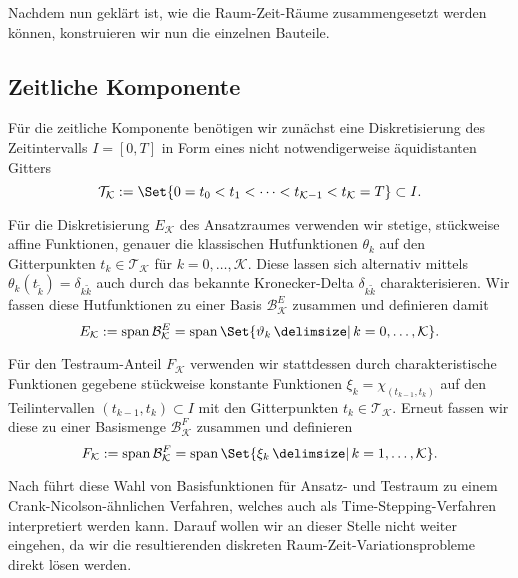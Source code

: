 \documentclass[../main.tex]{subfiles}
\begin{document}
Nachdem nun geklärt ist, wie die Raum-Zeit-Räume zusammengesetzt werden können, konstruieren wir nun die einzelnen Bauteile.

\subsection*{Zeitliche Komponente}

Für die zeitliche Komponente benötigen wir zunächst eine Diskretisierung des Zeitintervalls $I = [0, T]$ in Form eines nicht notwendigerweise äquidistanten Gitters
\begin{equation}
\label{eq:zeitgitter}
    \mathcal T_{\mathcal K} := \Set{0 = t_0 < t_1 < \dots < t_{\mathcal K - 1} < t_{\mathcal K} = T} \subset I.
\end{equation}

Für die Diskretisierung $E_{\mathcal K}$ des Ansatzraumes verwenden wir stetige, stückweise affine Funktionen, genauer die klassischen Hutfunktionen $\theta_{k}$ auf den Gitterpunkten $t_{k} \in \mathcal T_{\mathcal K}$ für $k = 0, \dots, \mathcal K$.
Diese lassen sich alternativ mittels $\theta_{k}(t_{\tilde{k}}) = \delta_{k \tilde k}$ auch durch das bekannte Kronecker-Delta $\delta_{k \tilde k}$ charakterisieren.
Wir fassen diese Hutfunktionen zu einer Basis $\mathcal B^{E}_{\mathcal K}$ zusammen und definieren damit
\begin{equation}
    \label{eq:zeitanteil_ansatzraum}
    E_{\mathcal K} := \spn \mathcal B^{E}_{\mathcal K} = \spn \Set{ \theta_{k} \given k = 0, \dots, \mathcal K }.
\end{equation}

Für den Testraum-Anteil $F_{\mathcal K}$ verwenden wir stattdessen durch charakteristische Funktionen gegebene stückweise konstante Funktionen $\xi_{k} = \chi_{(t_{k-1}, t_{k})}$ auf den Teilintervallen $(t_{k - 1}, t_{k}) \subset I$ mit den Gitterpunkten $t_{k} \in \mathcal T_{\mathcal K}$.
Erneut fassen wir diese zu einer Basismenge $\mathcal B^{F}_{\mathcal K}$ zusammen und definieren
\begin{equation}
    \label{eq:zeitanteil_testraum}
    F_{\mathcal K} := \spn \mathcal B^{F}_{\mathcal K} = \spn \Set{ \xi_{k} \given k = 1, \dots, \mathcal K}.
\end{equation}

Nach \cite{Andreev:2012ep} führt diese Wahl von Basisfunktionen für Ansatz- und Testraum zu einem Crank-Nicolson-ähnlichen Verfahren, welches auch als Time-Stepping-Verfahren interpretiert werden kann.
Darauf wollen wir an dieser Stelle nicht weiter eingehen, da wir die resultierenden diskreten Raum-Zeit-Variationsprobleme direkt lösen werden.
\end{document}
